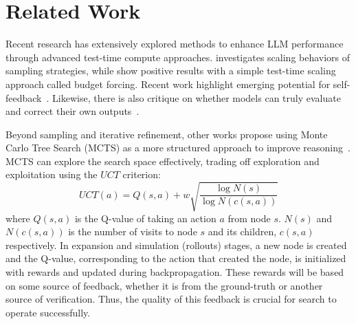 \section{Related Work}
Recent research has extensively explored methods to enhance LLM performance through advanced test-time compute approaches. \citet{wu2024inference} investigates scaling behaviors of sampling strategies, while \citet{muennighoff2025s1} show positive results with a simple test-time scaling approach called budget forcing.
Recent work highlight emerging potential for self-feedback~\cite{weng2023large,chen2025sets}. Likewise, there is also critique on whether models can truly evaluate and correct their own outputs~\cite{stechly2024selfverificationlimitationslargelanguage,kambhampati2024position}. 

Beyond sampling and iterative refinement, other works propose using Monte Carlo Tree Search (MCTS) as a more structured approach to improve reasoning~\cite{hao-etal-2023-reasoning, zhou2023language,zhang2024accessinggpt4levelmathematical}. MCTS can explore the search space effectively, trading off exploration and exploitation using the $UCT$ criterion: 
\begin{equation}
    UCT(a) = Q(s, a) + w\sqrt{ \frac{\log{N(s)} }{\log N(c(s, a)) } } \label{eq:UCT}
\end{equation}
where $Q(s, a)$ is the Q-value of taking an action $a$ from node $s$. $N(s)$  and $N(c(s, a))$ is the number of visits to node $s$ and its children, $c(s, a)$ respectively.  In  expansion and simulation (rollouts) stages, a new node is created and the Q-value, corresponding to the action that created the node, is initialized with rewards and updated during backpropagation. These rewards will be based on some source of feedback, whether it is from the ground-truth or another source of verification. Thus, the quality of this feedback is crucial for search to operate successfully.

